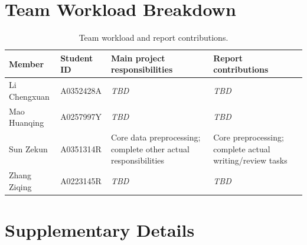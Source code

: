 \documentclass[conference]{IEEEtran}
\newif\ifoutline
\newcommand{\guide}[1]{%
  \ifoutline\par\noindent{\small\color{blue!65!black}%
  \textit{Writing prompt: #1}}\par\fi}
\newcommand{\pending}{\textit{TBD}}
\begin{document}
\clearpage
\appendices
\section{Team Workload Breakdown}
\label{app:workload}
\guide{Record actual completed contributions. The names, IDs and team name
come from the supplied progress slides. Confirm them before submission.
Only Sun Zekun's core-preprocessing responsibility is prefilled from the
conversation; complete all other entries from the team's actual workload.}
\begin{table}[t]
  \caption{Team workload and report contributions.}
  \label{tab:workload}
  \centering
  \small
  \begin{tabularx}{\textwidth}{llXX}
    \toprule
    Member & Student ID & Main project responsibilities & Report contributions \\
    \midrule
    Li Chengxuan & A0352428A & \pending & \pending \\
    Mao Huanqing & A0257997Y & \pending & \pending \\
    Sun Zekun & A0351314R & Core data preprocessing; complete other actual
    responsibilities & Core preprocessing; complete actual writing/review tasks \\
    Zhang Ziqing & A0223145R & \pending & \pending \\
    \bottomrule
  \end{tabularx}
\end{table}

\section{Supplementary Details}
\label{app:supplement}
\guide{Use sparingly. Include only the full hyperparameter search/configuration
table, a compact feature dictionary, or supplementary EDA/error tables that
help reproduce or elaborate the main results. Do not move the final model
definition, validation design, main results or essential interpretation out
of the main text. The paper must remain comprehensible without this appendix.}
\end{document}

